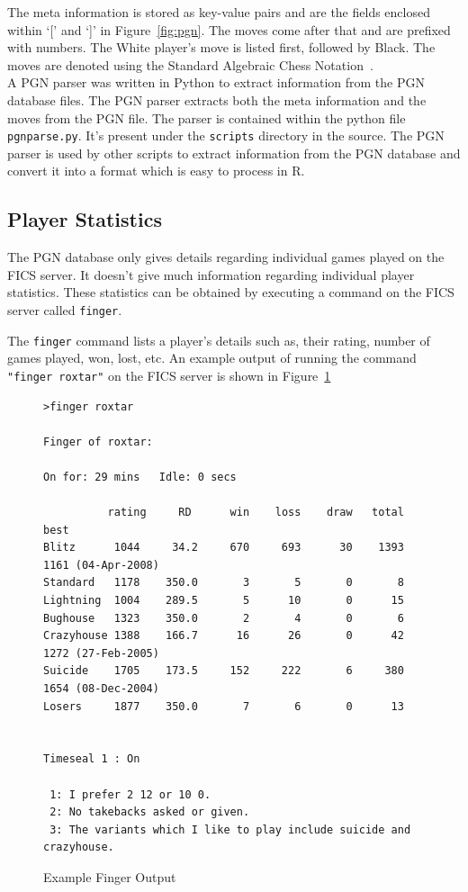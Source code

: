 \documentclass{article}
\begin{document}
The meta information is stored as key-value pairs and are the fields enclosed within `[' and `]' in Figure~\ref{fig:pgn}. The moves come after that and are prefixed with numbers. The White player's move is listed first, followed by Black. The moves are denoted using the Standard Algebraic Chess Notation~\cite{wiki:san}. \\

A PGN parser was written in Python to extract information from the PGN database files. The PGN parser extracts both the meta information and the moves from the PGN file. The parser is contained within the python file \verb=pgnparse.py=. It's present under the \verb=scripts= directory in the source. The PGN parser is used by other scripts to extract information from the PGN database and convert it into a format which is easy to process in R.

\subsection{Player Statistics}
\label{sec:pstats}
The PGN database only gives details regarding individual games played on the FICS server. It doesn't give much information regarding individual player statistics. These statistics can be  obtained  by executing a command on the FICS server called \verb=finger=. 

The \verb=finger= command lists a player's details such as, their rating, number of games played, won, lost, etc. An example output of running the command \verb="finger roxtar"= on the FICS server is shown in Figure~\ref{fig:finger}

\begin{figure}[htp]
\begin{verbatim}
>finger roxtar

Finger of roxtar:

On for: 29 mins   Idle: 0 secs

          rating     RD      win    loss    draw   total   best
Blitz      1044     34.2     670     693      30    1393   1161 (04-Apr-2008)
Standard   1178    350.0       3       5       0       8
Lightning  1004    289.5       5      10       0      15
Bughouse   1323    350.0       2       4       0       6
Crazyhouse 1388    166.7      16      26       0      42   1272 (27-Feb-2005)
Suicide    1705    173.5     152     222       6     380   1654 (08-Dec-2004)
Losers     1877    350.0       7       6       0      13


Timeseal 1 : On

 1: I prefer 2 12 or 10 0.
 2: No takebacks asked or given.
 3: The variants which I like to play include suicide and crazyhouse.
\end{verbatim}
\caption{Example Finger Output}
\label{fig:finger}
\end{figure}
\end{document}
